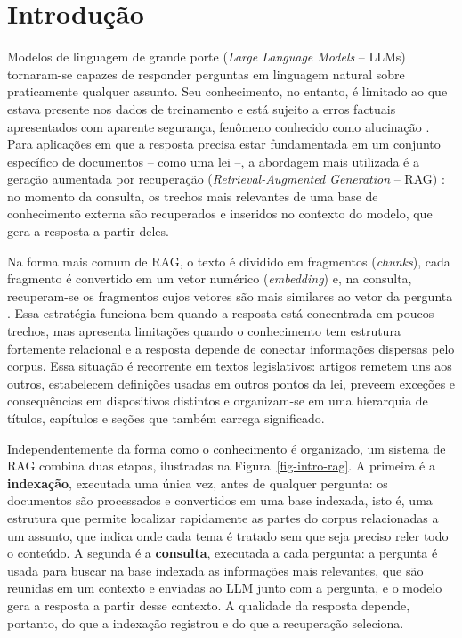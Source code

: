\chapter{Introdução}
\label{sec-intro}

Modelos de linguagem de grande porte (\textit{Large Language Models} -- LLMs) \cite{vaswani2017attention, brown2020language} tornaram-se capazes de responder perguntas em linguagem natural sobre praticamente qualquer assunto. Seu conhecimento, no entanto, é limitado ao que estava presente nos dados de treinamento e está sujeito a erros factuais apresentados com aparente segurança, fenômeno conhecido como alucinação \cite{ji2023survey}. Para aplicações em que a resposta precisa estar fundamentada em um conjunto específico de documentos -- como uma lei --, a abordagem mais utilizada é a geração aumentada por recuperação (\textit{Retrieval-Augmented Generation} -- RAG) \cite{lewis2020retrieval}: no momento da consulta, os trechos mais relevantes de uma base de conhecimento externa são recuperados e inseridos no contexto do modelo, que gera a resposta a partir deles.

Na forma mais comum de RAG, o texto é dividido em fragmentos (\textit{chunks}), cada fragmento é convertido em um vetor numérico (\textit{embedding}) e, na consulta, recuperam-se os fragmentos cujos vetores são mais similares ao vetor da pergunta \cite{gao2023retrieval}. Essa estratégia funciona bem quando a resposta está concentrada em poucos trechos, mas apresenta limitações quando o conhecimento tem estrutura fortemente relacional e a resposta depende de conectar informações dispersas pelo corpus. Essa situação é recorrente em textos legislativos: artigos remetem uns aos outros, estabelecem definições usadas em outros pontos da lei, preveem exceções e consequências em dispositivos distintos e organizam-se em uma hierarquia de títulos, capítulos e seções que também carrega significado.

Independentemente da forma como o conhecimento é organizado, um sistema de RAG combina duas etapas, ilustradas na Figura~\ref{fig-intro-rag}. A primeira é a \textbf{indexação}, executada uma única vez, antes de qualquer pergunta: os documentos são processados e convertidos em uma base indexada, isto é, uma estrutura que permite localizar rapidamente as partes do corpus relacionadas a um assunto, que indica onde cada tema é tratado sem que seja preciso reler todo o conteúdo. A segunda é a \textbf{consulta}, executada a cada pergunta: a pergunta é usada para buscar na base indexada as informações mais relevantes, que são reunidas em um contexto e enviadas ao LLM junto com a pergunta, e o modelo gera a resposta a partir desse contexto. A qualidade da resposta depende, portanto, do que a indexação registrou e do que a recuperação seleciona.

